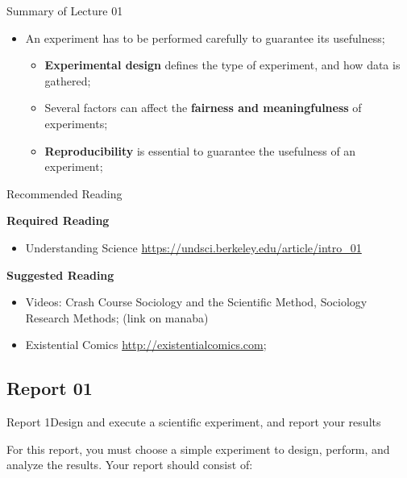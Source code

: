 \documentclass[aspectratio=169]{beamer}
\begin{document}
\begin{CJK}{UTF8}{ipxm}
\begin{frame}{Summary of Lecture 01}
\begin{itemize}
    \item An experiment has to be performed carefully to guarantee its usefulness;
    \begin{itemize}
      \item {\bf Experimental design} defines the type of experiment, and how data is gathered;
      \item Several factors can affect the {\bf fairness and meaningfulness} of experiments;
      \item {\bf Reproducibility} is essential to guarantee the usefulness of an experiment;
    \end{itemize}
  \end{itemize}

\end{frame}

\begin{frame}{Recommended Reading}

  {\bf Required Reading}
  \begin{itemize}
    \item Understanding Science \url{https://undsci.berkeley.edu/article/intro_01}
  \end{itemize}
  \bigskip

  {\bf Suggested Reading}
  \begin{itemize}
    \item Videos: Crash Course Sociology and the Scientific Method, Sociology Research Methods; (link on manaba)
    \item Existential Comics \url{http://existentialcomics.com};
  \end{itemize}
\end{frame}

\subsection{Report 01}
\begin{frame}{Report 1}{Design and execute a scientific experiment, and report your results}

  For this report, you must choose a simple experiment to design, perform, and analyze the results. Your report should consist of:\medskip


\end{frame}
\end{CJK}
\end{document}
